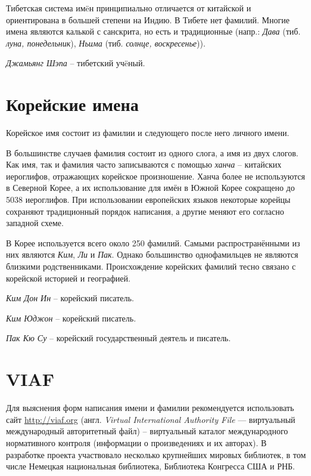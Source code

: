 Тибетская система им\"eн принципиально отличается от китайской и ориентирована в большей степени на Индию. В Тибете нет фамилий. Многие имена являются калькой с санскрита, но есть и традиционные (напр.: \emph{Дава} (тиб. \emph{луна, понедельник}), \emph{Ньима} (тиб. \emph{солнце, воскресенье})).

\emph{Джамьянг Шэпа} -- тибетский уч\"eный.

\section{Корейские имена}

Корейское имя состоит из фамилии и следующего после него личного имени.

В большинстве случаев фамилия состоит из одного слога, а имя из двух слогов. Как имя, так и фамилия часто записываются с помощью \emph{ханча} -- китайских иероглифов, отражающих корейское произношение. Ханча более не используются в Северной Корее, а их использование для имён в Южной Корее сокращено до 5038 иероглифов. При использовании европейских языков некоторые корейцы сохраняют традиционный порядок написания, а другие меняют его согласно западной схеме.

В Корее используется всего около 250 фамилий. Самыми распространёнными из них являются \emph{Ким}, \emph{Ли} и \emph{Пак}. Однако большинство однофамильцев не являются близкими родственниками. Происхождение корейских фамилий тесно связано с корейской историей и географией.

\emph{Ким Дон Ин} -- корейский писатель.

\emph{Ким Юджон} -- корейский писатель.

\emph{Пак Кю Су} -- корейский государственный деятель и писатель.



\section{VIAF}

Для выяснения форм написания имени и фамилии рекомендуется использовать сайт \underline{http://viaf.org} (англ. \emph{Virtual International Authority File} — виртуальный международный авторитетный файл) -- виртуальный каталог международного нормативного контроля (информации о произведениях и их авторах). В разработке проекта участвовало несколько крупнейших мировых библиотек, в том числе Немецкая национальная библиотека, Библиотека Конгресса США и РНБ.

